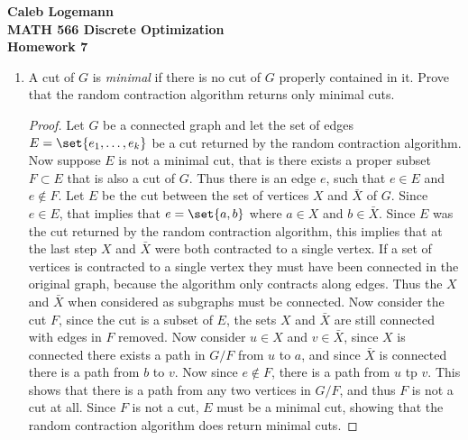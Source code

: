 \documentclass[11pt, oneside]{article}
\begin{document}
\noindent \textbf{\Large{Caleb Logemann \\
MATH 566 Discrete Optimization\\
Homework 7
}}

%
\begin{enumerate}
  \item %
    A cut of $G$ is \emph{minimal} if there is no cut of $G$ properly contained
    in it.
    Prove that the random contraction algorithm returns only minimal cuts.

    \begin{proof}
      Let $G$ be a connected graph and let the set of edges
      $E = \set{e_1, \ldots, e_k}$ be a cut returned by the random contraction
      algorithm.
      Now suppose $E$ is not a minimal cut, that is there exists a proper subset
      $F \subset E$ that is also a cut of $G$.
      Thus there is an edge $e$, such that $e \in E$ and $e \not\in F$.
      Let $E$ be the cut between the set of vertices $X$ and $\bar{X}$ of $G$.
      Since $e \in E$, that implies that $e = \set{a, b}$ where $a \in X$ and
      $b \in \bar{X}$.
      Since $E$ was the cut returned by the random contraction algorithm, this
      implies that at the last step $X$ and $\bar{X}$ were both contracted to a
      single vertex.
      If a set of vertices is contracted to a single vertex they must have been
      connected in the original graph, because the algorithm only contracts
      along edges.
      Thus the $X$ and $\bar{X}$ when considered as subgraphs must be connected.
      Now consider the cut $F$, since the cut is a subset of $E$, the sets $X$
      and $\bar{X}$ are still connected with edges in $F$ removed.
      Now consider $u \in X$ and $v \in \bar{X}$, since $X$ is connected there
      exists a path in $G/F$ from $u$ to $a$, and since $\bar{X}$ is connected
      there is a path from $b$ to $v$.
      Now since $e \not\in F$, there is a path from $u$ tp $v$.
      This shows that there is a path from any two vertices in $G/F$, and thus
      $F$ is not a cut at all.
      Since $F$ is not a cut, $E$ must be a minimal cut, showing that the
      random contraction algorithm does return minimal cuts.
    \end{proof}


\end{enumerate}
\end{document}
